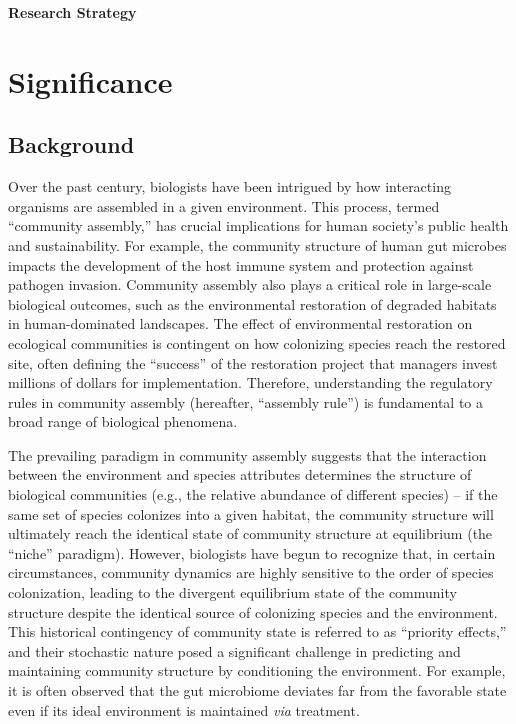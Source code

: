 \documentclass[12pt, class=article, crop=false]{standalone}
\begin{document}
\textbf{Research Strategy}

\section{Significance}

\subsection*{Background}

Over the past century, biologists have been intrigued by how interacting organisms are assembled in a given environment.
This process, termed ``community assembly,'' has crucial implications for human society's public health and sustainability.
For example, the community structure of human gut microbes impacts the development of the host immune system and protection against pathogen invasion.
Community assembly also plays a critical role in large-scale biological outcomes, such as the environmental restoration of degraded habitats in human-dominated landscapes.
The effect of environmental restoration on ecological communities is contingent on how colonizing species reach the restored site, often defining the ``success'' of the restoration project that managers invest millions of dollars for implementation.
Therefore, understanding the regulatory rules in community assembly (hereafter, ``assembly rule'') is fundamental to a broad range of biological phenomena.

The prevailing paradigm in community assembly suggests that the interaction between the environment and species attributes determines the structure of biological communities  (e.g., the relative abundance of different species) -- if the same set of species colonizes into a given habitat, the community structure will ultimately reach the identical state of community structure at equilibrium (the ``niche'' paradigm).
However, biologists have begun to recognize that, in certain circumstances, community dynamics are highly sensitive to the order of species colonization, leading to the divergent equilibrium state of the community structure despite the identical source of colonizing species and the environment.
This historical contingency of community state is referred to as ``priority effects,'' and their stochastic nature posed a significant challenge in predicting and maintaining community structure by conditioning the environment.
For example, it is often observed that the gut microbiome deviates far from the favorable state even if its ideal environment is maintained \textit{via} treatment.
\end{document}
